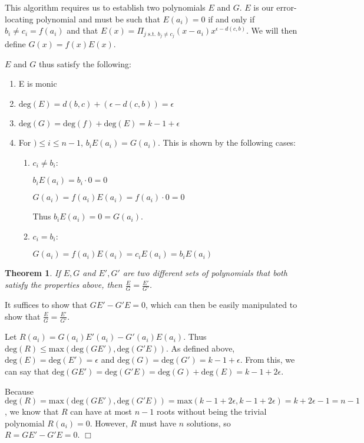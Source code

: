 \documentclass{article}
\newtheorem{theorem}{Theorem}
\newenvironment{proof}{\noindent{\em Proof:}}{$\Box$~\\}
\begin{document}
This algorithm requires us to establish two polynomials $E$ and $G$. $E$ is our error-locating polynomial and must be such that $E(a_i)=0$ if and only if $b_i\neq c_i=f(a_i)$ and that $E(x)=\Pi_{j\text{ s.t. }b_j\neq c_j}(x-a_i)x^{\epsilon-d(c,b)}$. We will then define $G(x)=f(x)E(x)$.

$E$ and $G$ thus satisfy the following:
\begin{enumerate}
    \item E is monic
    \item $\text{deg}(E)=d(b,c)+(\epsilon-d(c,b))=\epsilon$
    \item $\text{deg}(G)=\text{deg}(f)+\text{deg}(E)=k-1+\epsilon$
    \item For $)\leq i\leq n-1$, $b_iE(a_i)=G(a_i)$. This is shown by the following cases:
    \begin{enumerate}
        \item $c_i\neq b_i$: 

        $b_iE(a_i)=b_i\cdot0=0$

        $G(a_i)=f(a_i)E(a_i)=f(a_i)\cdot0=0$

        Thus $b_iE(a_i)=0=G(a_i)$.
        \item $c_i=b_i$:

        $G(a_i)=f(a_i)E(a_i)=c_iE(a_i)=b_iE(a_i)$
    \end{enumerate}
\end{enumerate}

\begin{theorem}
    If $E,G$ and $E',G'$ are two different sets of polynomials that both satisfy the properties above, then $\frac{E}{G}=\frac{E'}{G'}$.
\end{theorem}

\begin{proof}
    It suffices to show that $GE'-G'E=0$, which can then be easily manipulated to show that $\frac{E}{G}=\frac{E'}{G'}$.

    Let $R(a_i)=G(a_i)E'(a_i)-G'(a_i)E(a_i)$. Thus $\text{deg}(R)\leq \text{max}(\text{deg}(GE'),\text{deg}(G'E))$. As defined above, $\text{deg}(E)=\text{deg}(E')=\epsilon$ and $\text{deg}(G)=\text{deg}(G')=k-1+\epsilon$. From this, we can say that $\text{deg}(GE')=\text{deg}(G'E)=\text{deg}(G)+\text{deg}(E)=k-1+2\epsilon$.

    Because $\text{deg}(R)=\text{max}(\text{deg}(GE'),\text{deg}(G'E))=\text{max}(k-1+2\epsilon,k-1+2\epsilon)=k+2\epsilon-1=n-1$, we know that $R$ can have at most $n-1$ roots without being the trivial polynomial $R(a_i)=0$. However, $R$ must have $n$ solutions, so $R=GE'-G'E=0$.
\end{proof}
\end{document}
